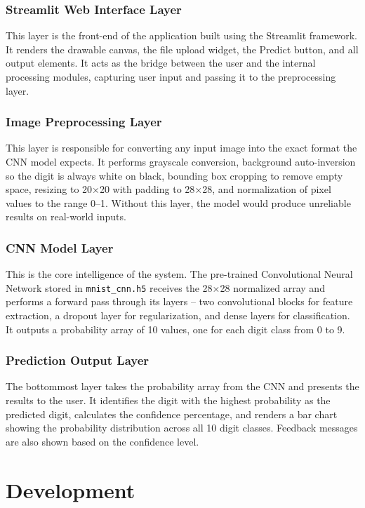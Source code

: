 \documentclass[12pt,a4paper]{report}
\begin{document}
\subsubsection{Streamlit Web Interface Layer}
This layer is the front-end of the application built using the Streamlit framework. It renders the drawable canvas, the file upload widget, the Predict button, and all output elements. It acts as the bridge between the user and the internal processing modules, capturing user input and passing it to the preprocessing layer.

\subsubsection{Image Preprocessing Layer}
This layer is responsible for converting any input image into the exact format the CNN model expects. It performs grayscale conversion, background auto-inversion so the digit is always white on black, bounding box cropping to remove empty space, resizing to 20×20 with padding to 28×28, and normalization of pixel values to the range 0--1. Without this layer, the model would produce unreliable results on real-world inputs.

\subsubsection{CNN Model Layer}
This is the core intelligence of the system. The pre-trained Convolutional Neural Network stored in \texttt{mnist\_cnn.h5} receives the 28×28 normalized array and performs a forward pass through its layers -- two convolutional blocks for feature extraction, a dropout layer for regularization, and dense layers for classification. It outputs a probability array of 10 values, one for each digit class from 0 to 9.

\subsubsection{Prediction Output Layer}
The bottommost layer takes the probability array from the CNN and presents the results to the user. It identifies the digit with the highest probability as the predicted digit, calculates the confidence percentage, and renders a bar chart showing the probability distribution across all 10 digit classes. Feedback messages are also shown based on the confidence level.

\newpage
\section{Development}
\end{document}
